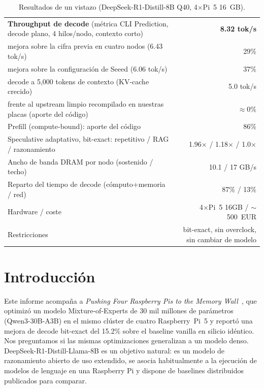 \documentclass[10pt,a4paper]{article}
\begin{document}
\begin{table}[h]
\centering\small
\caption{Resultados de un vistazo (DeepSeek-R1-Distill-8B Q40, 4$\times$Pi~5 16~GB).}
\begin{tabularx}{\textwidth}{@{}Xr@{}}
\toprule
\textbf{Throughput de decode} (métrica CLI Prediction, decode plano, 4 hilos/nodo, contexto corto) & \textbf{8.32 tok/s} \\
\quad mejora sobre la cifra previa en cuatro nodos (6.43 tok/s) & 29\% \\
\quad mejora sobre la configuración de Seeed (6.06 tok/s) & 37\% \\
\quad decode a 5{,}000 tokens de contexto (KV-cache crecido) & 5.0 tok/s \\
\quad frente al upstream limpio recompilado en nuestras placas (aporte del código) & $\approx$0\% \\
Prefill (compute-bound): aporte del código & 86\% \\
Speculative adaptativo, bit-exact: repetitivo / RAG / razonamiento & 1.96$\times$ / 1.18$\times$ / 1.0$\times$ \\
Ancho de banda DRAM por nodo (sostenido / techo) & 10.1 / 17 GB/s \\
Reparto del tiempo de decode (cómputo+memoria / red) & 87\% / 13\% \\
Hardware / coste & 4$\times$Pi~5 16GB / $\sim$500~EUR \\
Restricciones & bit-exact, sin overclock, sin cambiar de modelo \\
\bottomrule
\end{tabularx}
\end{table}

\section{Introducción}
Este informe acompaña a \emph{Pushing Four Raspberry Pis to the Memory Wall}~\citep{correa2026moe}, que optimizó un modelo Mixture-of-Experts de 30 mil millones de parámetros (Qwen3-30B-A3B) en el mismo clúster de cuatro Raspberry~Pi~5 y reportó una mejora de decode bit-exact del 15.2\% sobre el baseline vanilla en silicio idéntico. Nos preguntamos si las mismas optimizaciones generalizan a un modelo denso. DeepSeek-R1-Distill-Llama-8B es un objetivo natural: es un modelo de razonamiento abierto de uso extendido, se asocia habitualmente a la ejecución de modelos de lenguaje en una Raspberry Pi y dispone de baselines distribuidos publicados para comparar.
\end{document}
